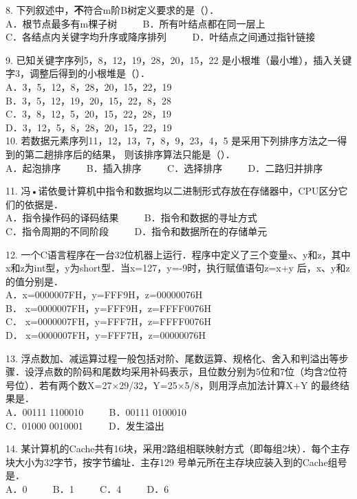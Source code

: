 8. 下列叙述中，\textbf{不}符合m阶B树定义要求的是（）． \\
A．根节点最多有m棵子树 $\qquad$ B．所有叶结点都在同一层上 \\
C．各结点内关键字均升序或降序排列 $\qquad$ D．叶结点之间通过指针链接

9. 已知关键字序列5，8，12，19，28，20，15，22 是小根堆（最小堆），插入关键字3，调整后得到的小根堆是（）． \\
A．3，5，12，8，28，20，15，22，19 \\
B．3，5，12，19，20，15，22，8，28 \\
C．3，8，12，5，20，15，22，28，19 \\
D．3，12，5，8，28，20，15，22，19 \\

10. 若数据元素序列11，12，13，7，8，9，23，4，5 是采用下列排序方法之一得到的第二趟排序后的结果，
则该排序算法只能是（）． \\
A．起泡排序 $\qquad$ B．插入排序 $\qquad$ C．选择排序 $\qquad$ D．二路归并排序

11. 冯•诺依曼计算机中指令和数据均以二进制形式存放在存储器中，CPU区分它们的依据是． \\
A．指令操作码的译码结果 $\qquad$ B．指令和数据的寻址方式 \\
C．指令周期的不同阶段 $\qquad$ D．指令和数据所在的存储单元

12. 一个C语言程序在一台32位机器上运行．程序中定义了三个变量x、y和z，其中x和z为int型，y为short型．当x=127，y=-9时，执行赋值语句z=x+y 后，x、y和z的值分别是． \\
A．x=0000007FH，y=FFF9H，z=00000076H \\
B． x=0000007FH，y=FFF9H，z=FFFF0076H \\
C． x=0000007FH，y=FFF7H，z=FFFF0076H \\
D． x=0000007FH，y=FFF7H，z=00000076H

13. 浮点数加、减运算过程一般包括对阶、尾数运算、规格化、舍入和判溢出等步骤．设浮点数的阶码和尾数均采用补码表示，且位数分别为5位和7位（均含2位符号位）．若有两个数X=27×29/32，Y=25×5/8，则用浮点加法计算X+Y 的最终结果是． \\
A．00111 1100010 $\qquad$ B．00111 0100010 \\
C．01000 0010001 $\qquad$ D．发生溢出

14. 某计算机的Cache共有16块，采用2路组相联映射方式（即每组2块）．每个主存块大小为32字节，按字节编址．主存129 号单元所在主存块应装入到的Cache组号是． \\
A．0 $\qquad$ B．1 $\qquad$ C．4 $\qquad$ D．6

